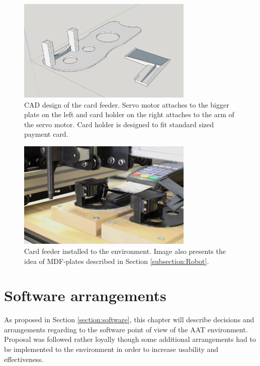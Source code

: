 \begin{figure}[ht]
  \begin{center}
    \includegraphics[width=8.4cm]{images/card_feeder.png}
    \caption{CAD design of the card feeder. Servo motor attaches to the bigger plate on the left and card holder on the right attaches to the arm of the servo motor. Card holder is designed to fit standard sized payment card.}
    \label{fig:card_feeder}
  \end{center}
\end{figure}

\begin{figure}[ht]
  \begin{center}
    \includegraphics[width=8.4cm]{images/card_feeder_2.jpg}
    \caption{Card feeder installed to the environment. Image also presents the idea of MDF-plates described in Section \ref{subsection:Robot}.}
    \label{fig:card_feeder_2}
  \end{center}
\end{figure}
\FloatBarrier

\section{Software arrangements}
\label{section:Software arrangements}

As proposed in Section \ref{section:software}, this chapter will describe decisions and arrangements regarding to the software point of view of the AAT environment. Proposal was followed rather loyally though some additional arrangements had to be implemented to the environment in order to increase usability and effectiveness.

